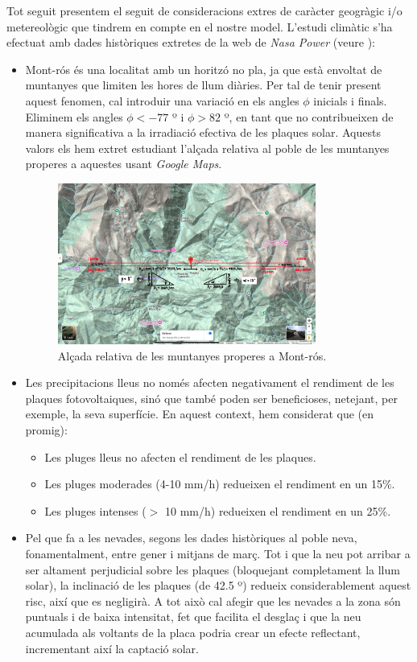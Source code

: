 \documentclass[10pt, twoside, a4paper]{article}
\begin{document}
Tot seguit presentem el seguit de consideracions extres de caràcter geogràgic i/o metereològic que tindrem en compte en el nostre model. L'estudi climàtic s'ha efectuat amb dades històriques extretes de la web de \textit{Nasa Power} (veure \cite{ref6}):
\begin{itemize}
    \item Mont-rós és una localitat amb un horitzó no pla, ja que està envoltat de muntanyes que limiten les hores de llum diàries. Per tal de tenir present aquest fenomen, cal introduir una variació en els angles $\phi$ inicials i finals. Eliminem els angles $\phi < -77$ º i $\phi > 82$ º, en tant que no contribueixen de manera significativa a la irradiació efectiva de les plaques solar. Aquests valors els hem extret estudiant l'alçada relativa al poble de les muntanyes properes a aquestes usant \textit{Google Maps}. 
    \begin{figure}[h!]
        \centering
        \includegraphics[width=0.8\textwidth]{MapaMuntanyes.jpg}
        \caption{Alçada relativa de les muntanyes properes a Mont-rós.}
        \label{fig:alçada_muntanyes}
    \end{figure}
    \item Les precipitacions lleus no només afecten negativament el rendiment de les plaques fotovoltaiques, sinó que també poden ser beneficioses, netejant, per exemple, la seva superfície. En aquest context, hem considerat que (en promig):
    \begin{itemize}
        \item Les pluges lleus no afecten el rendiment de les plaques.
        \item Les pluges moderades (4-10 mm/h) redueixen el rendiment en un 15\%.
        \item Les pluges intenses ($>$ 10 mm/h) redueixen el rendiment en un 25\%.
    \end{itemize}
    \item Pel que fa a les nevades, segons les dades històriques al poble neva, fonamentalment, entre gener i mitjans de març. Tot i que la neu pot arribar a ser altament perjudicial sobre les plaques (bloquejant completament la llum solar), la inclinació de les plaques (de 42.5 º) redueix considerablement aquest risc, així que es negligirà. A tot això cal afegir que les nevades a la zona són puntuals i de baixa intensitat, fet que facilita el desglaç i que la neu acumulada als voltants de la placa podria crear un efecte reflectant, incrementant així la captació solar.

\end{itemize}
\end{document}
